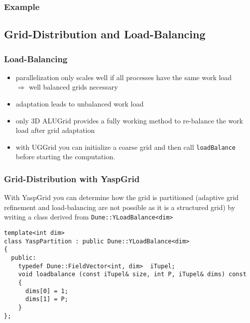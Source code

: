 \begin{frame} \frametitle{Example}
  
\end{frame}

\subsection{Grid-Distribution and Load-Balancing}
\begin{frame}[fragile]
  \frametitle<presentation>{Load-Balancing}
  \begin{itemize}
  \item parallelization only scales well if all processes have the
    same work load\\
    $\Rightarrow$ well balanced grids necessary
  \item adaptation leads to unbalanced work load
  \item only 3D ALUGrid provides a fully working method to re-balance the work load after grid adaptation
   \item with UGGrid you can initialize a coarse grid and then call \lstinline!loadBalance! before starting the
         computation.
  \end{itemize}
\end{frame}

\begin{frame}[fragile]
  \frametitle{Grid-Distribution with YaspGrid}
With YaspGrid you can determine how the grid is partitioned (adaptive grid refinement and load-balancing are not possible as it is a structured grid) by writing a class derived from
\lstinline!Dune::YLoadBalance<dim>!

\begin{lstlisting}[breaklines=true]
template<int dim>
class YaspPartition : public Dune::YLoadBalance<dim>
{
  public:
    typedef Dune::FieldVector<int, dim>  iTupel;
    void loadbalance (const iTupel& size, int P, iTupel& dims) const
    {
      dims[0] = 1;
      dims[1] = P;
    }
};
\end{lstlisting}
\end{frame}

